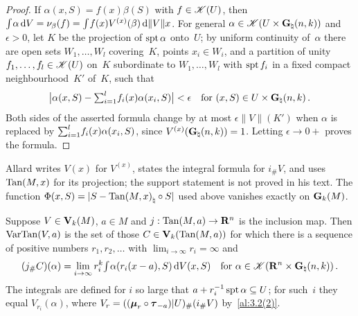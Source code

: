 \begin{proof}
    If $\alpha(x,S) = f(x) \beta(S)$ with $f \in \mathscr{K}(U)$, then ${\textstyle\int_{}^{}} \alpha \,\mathrm{d} V =
    \nu_\beta(f) = {\textstyle\int_{}^{}} f(x) V^{(x)}(\beta) \,\mathrm{d} \|V\| x$. For general $\alpha \in
    \mathscr{K}(U \times \mathbf{G}_{\natural}(n,k))$ and $\epsilon > 0$, let $K$ be the projection of
    $\operatorname{spt} \alpha$ onto~$U$; by uniform continuity of~$\alpha$ there are open sets $W_1, \ldots,
    W_l$ covering~$K$, points $x_i \in W_i$, and a partition of unity $f_1, \ldots, f_l \in
    \mathscr{K}(U)$ on~$K$ subordinate to $W_1, \ldots, W_l$ with $\operatorname{spt} f_i$ in a fixed compact
    neighbourhood~$K'$ of~$K$, such that
    \begin{displaymath}
        \big| \alpha(x,S) - {\textstyle\sum_{i=1}^{l}} f_i(x) \alpha(x_i,S) \big| < \epsilon \quad \text{for
        $(x,S) \in U \times \mathbf{G}_{\natural}(n,k)$} \,.
    \end{displaymath}
    Both sides of the asserted formula change by at most $\epsilon \|V\|(K')$ when $\alpha$ is
    replaced by ${\textstyle\sum_{i=1}^{l}} f_i(x) \alpha(x_i,S)$, since $V^{(x)}(\mathbf{G}_{\natural}(n,k)) =
    1$. Letting $\epsilon \to 0+$ proves the formula.
\end{proof}

\begin{remark}
    \label{rem:3.3}
    Allard writes $V(x)$ for $V^{(x)}$, states the integral formula for $i_\# V$, and uses
    $\operatorname{Tan}(M,x)$ for its projection; the support statement is not proved in his text. The
    function $\Phi(x,S) = |S - {\operatorname{Tan}(M,x)}_\natural \circ S|$ used above vanishes exactly on
    $\mathbf{G}_{k}(M)$.
\end{remark}

\begin{definition}
    \label{al:3.4}
    Suppose $V \in \mathbf{V}_{k}(M)$, $a \in M$ and $j : \operatorname{Tan}(M,a) \to \mathbf{R}^{n}$ is the
    inclusion map. Then $\operatorname{VarTan}(V,a)$ is the set of those $C \in \mathbf{V}_{k}(\operatorname{Tan}(M,a))$ for
    which there is a sequence of positive numbers $r_1, r_2, \ldots$ with $\lim_{i \to \infty}
    r_i = \infty$ and
    \begin{displaymath}
        (j_\# C)(\alpha) = \lim_{i \to \infty} r_i^{k} {\textstyle\int_{}^{}} \alpha(r_i(x-a),S) \,\mathrm{d} V(x,S)
        \quad \text{for $\alpha \in \mathscr{K}(\mathbf{R}^{n} \times \mathbf{G}_{\natural}(n,k))$} \,.
    \end{displaymath}
    The integrals are defined for $i$ so large that $a + r_i^{-1} \operatorname{spt} \alpha \subseteq U$; for
    such~$i$ they equal $V_{r_i}(\alpha)$, where $V_r = ((\boldsymbol{\mu}_{r} \circ \boldsymbol{\tau}_{-a}) | U)_\#
    (i_\# V)$ by~\ref{al:3.2(2)}.
\end{definition}

